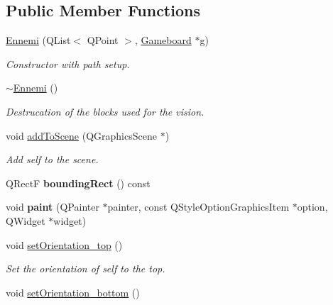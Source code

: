 \subsection*{Public Member Functions}
\begin{DoxyCompactItemize}
\item 
\hyperlink{class_ennemi_af86e9134a1cfd8d878305924702b9d7a}{Ennemi} (Q\+List$<$ Q\+Point $>$, \hyperlink{class_gameboard}{Gameboard} $\ast$g)
\begin{DoxyCompactList}\small\item\em Constructor with path setup. \end{DoxyCompactList}\item 
\hypertarget{class_ennemi_adf402a9389efe705c604f91d6e74d00e}{}\hyperlink{class_ennemi_adf402a9389efe705c604f91d6e74d00e}{$\sim$\+Ennemi} ()\label{class_ennemi_adf402a9389efe705c604f91d6e74d00e}

\begin{DoxyCompactList}\small\item\em Destrucation of the blocks used for the vision. \end{DoxyCompactList}\item 
\hypertarget{class_ennemi_ae62d1dcf274319710e7ac4495c95a221}{}void \hyperlink{class_ennemi_ae62d1dcf274319710e7ac4495c95a221}{add\+To\+Scene} (Q\+Graphics\+Scene $\ast$)\label{class_ennemi_ae62d1dcf274319710e7ac4495c95a221}

\begin{DoxyCompactList}\small\item\em Add self to the scene. \end{DoxyCompactList}\item 
\hypertarget{class_ennemi_aa00ff90bbb5d71456a23673e77c41bb4}{}Q\+Rect\+F {\bfseries bounding\+Rect} () const \label{class_ennemi_aa00ff90bbb5d71456a23673e77c41bb4}

\item 
\hypertarget{class_ennemi_afbdea6c2e62c2065694a32db0f049325}{}void {\bfseries paint} (Q\+Painter $\ast$painter, const Q\+Style\+Option\+Graphics\+Item $\ast$option, Q\+Widget $\ast$widget)\label{class_ennemi_afbdea6c2e62c2065694a32db0f049325}

\item 
\hypertarget{class_ennemi_a7c509f048996eecb4ee768a044825d15}{}void \hyperlink{class_ennemi_a7c509f048996eecb4ee768a044825d15}{set\+Orientation\+\_\+top} ()\label{class_ennemi_a7c509f048996eecb4ee768a044825d15}

\begin{DoxyCompactList}\small\item\em Set the orientation of self to the top. \end{DoxyCompactList}\item 
\hypertarget{class_ennemi_ab3bbc6381307320c22b1686c5bc59d93}{}void \hyperlink{class_ennemi_ab3bbc6381307320c22b1686c5bc59d93}{set\+Orientation\+\_\+bottom} ()\label{class_ennemi_ab3bbc6381307320c22b1686c5bc59d93}


\end{DoxyCompactItemize}
